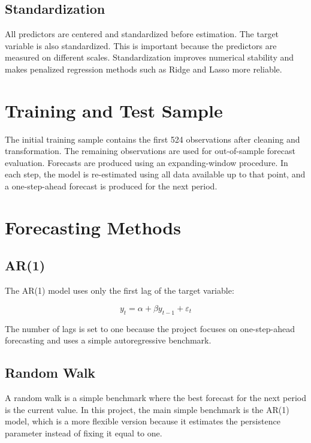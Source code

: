 \documentclass[
  letterpaper,
  DIV=11,
  numbers=noendperiod]{scrartcl}
\begin{document}
\subsection{Standardization}\label{standardization}

All predictors are centered and standardized before estimation. The
target variable is also standardized. This is important because the
predictors are measured on different scales. Standardization improves
numerical stability and makes penalized regression methods such as Ridge
and Lasso more reliable.

\section{Training and Test Sample}\label{training-and-test-sample}

The initial training sample contains the first 524 observations after
cleaning and transformation. The remaining observations are used for
out-of-sample forecast evaluation. Forecasts are produced using an
expanding-window procedure. In each step, the model is re-estimated
using all data available up to that point, and a one-step-ahead forecast
is produced for the next period.

\section{Forecasting Methods}\label{forecasting-methods}

\subsection{AR(1)}\label{ar1}

The AR(1) model uses only the first lag of the target variable:

\[
y_t = \alpha + \beta y_{t-1} + \varepsilon_t
\]

The number of lags is set to one because the project focuses on
one-step-ahead forecasting and uses a simple autoregressive benchmark.

\subsection{Random Walk}\label{random-walk}

A random walk is a simple benchmark where the best forecast for the next
period is the current value. In this project, the main simple benchmark
is the AR(1) model, which is a more flexible version because it
estimates the persistence parameter instead of fixing it equal to one.
\end{document}

